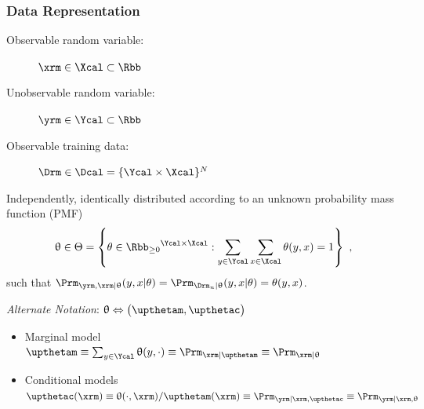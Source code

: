 \documentclass[aspectratio=169]{beamer}
\begin{document}
\begin{frame}
\frametitle{Data Representation}

\begin{description}
\item[Observable random variable:] $\xrm \in \Xcal \subset \Rbb$
\item[Unobservable random variable:] $\yrm \in \Ycal \subset \Rbb$
\item[Observable training data:] $\Drm \in \Dcal = \{\Ycal \times \Xcal\}^N$
\end{description}

\vspace{0.5em}

Independently, identically distributed according to an \alert{unknown} probability mass function (PMF) 
\begin{equation*}
\uptheta \in \Theta = \left\{ \theta \in {\Rbb_{\geq 0}}^{\Ycal \times \Xcal}: \sum_{y \in \Ycal} \sum_{x \in \Xcal} \theta(y,x) = 1 \right\} \ ,
\end{equation*}
such that $\Prm_{\yrm,\xrm | \uptheta}(y,x | \theta) = \Prm_{\Drm_n | \uptheta}(y,x | \theta) = \theta(y,x)$.

\hrulefill

\vspace{0.5em}
\textit{Alternate Notation}: $\uptheta \Leftrightarrow \big( \upthetam,\upthetac \big)$
\begin{itemize}
\item Marginal model $\upthetam \equiv \sum_{y \in \Ycal} \uptheta(y,\cdot) \equiv \Prm_{\xrm | \upthetam} \equiv \Prm_{\xrm | \uptheta} $
\item Conditional models $\upthetac(\xrm) \equiv \uptheta(\cdot,\xrm) / \upthetam(\xrm) \equiv \Prm_{\yrm | \xrm,\upthetac} \equiv \Prm_{\yrm | \xrm,\uptheta} $ 
\end{itemize}

\end{frame}
\end{document}
